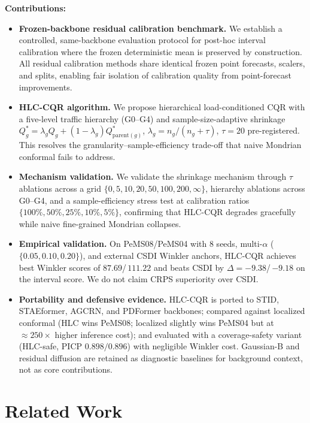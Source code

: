 \documentclass[letterpaper,journal]{IEEEtran}
\begin{document}
\textbf{Contributions:}
\begin{itemize}
    \item \textbf{Frozen-backbone residual calibration benchmark.}  We
    establish a controlled, same-backbone evaluation protocol for post-hoc
    interval calibration where the frozen deterministic mean is preserved by
    construction.  All residual calibration methods share identical frozen
    point forecasts, scalers, and splits, enabling fair isolation of
    calibration quality from point-forecast improvements.
    \item \textbf{HLC-CQR algorithm.}  We propose hierarchical
    load-conditioned CQR with a five-level traffic hierarchy
    (G0--G4) and sample-size-adaptive shrinkage
    $Q^{*}_{g}=\lambda_{g}Q_{g}+(1-\lambda_{g})Q^{*}_{\text{parent}(g)}$,
    $\lambda_{g}=n_{g}/(n_{g}+\tau)$, $\tau=20$ pre-registered.
    This resolves the granularity--sample-efficiency trade-off that
    naive Mondrian conformal fails to address.
    \item \textbf{Mechanism validation.}  We validate the shrinkage
    mechanism through $\tau$ ablations across a grid
    $\{0, 5, 10, 20, 50, 100, 200, \infty\}$, hierarchy ablations
    across G0--G4, and a sample-efficiency stress test at calibration
    ratios $\{100\%, 50\%, 25\%, 10\%, 5\%\}$, confirming that HLC-CQR
    degrades gracefully while naive fine-grained Mondrian collapses.
    \item \textbf{Empirical validation.}  On PeMS08/PeMS04 with 8 seeds,
    multi-$\alpha$ ($\{0.05, 0.10, 0.20\}$), and external CSDI Winkler
    anchors, HLC-CQR achieves best Winkler scores of $87.69$/\,$111.22$
    and beats CSDI by $\Delta{=}{-9.38}$/\,$-9.18$ on the interval
    score.  We do not claim CRPS superiority over CSDI.
    \item \textbf{Portability and defensive evidence.}  HLC-CQR is
    ported to STID, STAEformer, AGCRN, and PDFormer backbones; compared
    against localized conformal (HLC wins PeMS08; localized slightly wins
    PeMS04 but at ${\approx}250\times$ higher inference cost); and
    evaluated with a coverage-safety variant (HLC-safe, PICP
    $0.898/0.896$) with negligible Winkler cost.  Gaussian-B and
    residual diffusion are retained as diagnostic baselines for background
    context, not as core contributions.
\end{itemize}

\section{Related Work}
\end{document}
